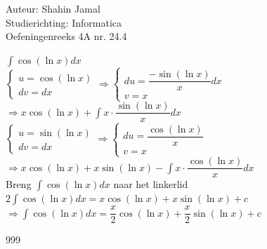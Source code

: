 \documentclass[a4paper]{article}
\begin{document}
  
\noindent \large Auteur: Shahin Jamal \\
\noindent \large Studierichting: Informatica\\
\noindent \large Oefeningenreeks 4A nr. 24.4\\

\medskip

\normalsize

$\displaystyle\int\cos(\ln x) dx$\\

$\left\{
   \begin{array}{l}
       u = \cos(\ln x)\\
       dv = dx
   \end{array}
\right.
\Rightarrow
\left\{
   \begin{array}{l}
       du = \dfrac{-\sin(\ln x)}{x}dx \\
       v = x
   \end{array}
\right.$\\

$\Rightarrow x\cos(\ln x) + \displaystyle\int x \cdot \dfrac{\sin(\ln x)}{x} dx$\\

$\left\{
   \begin{array}{l}
       u = \sin(\ln x)\\
       dv = dx
   \end{array}
\right.
\Rightarrow
\left\{
   \begin{array}{l}
       du = \dfrac{\cos(\ln x)}{x} \\
       v = x
   \end{array}
\right.$\\

$\Rightarrow x \cos(\ln x) + x\sin(\ln x) - \displaystyle\int x\cdot \dfrac{\cos(\ln x)}{x} dx$\\

Breng $\displaystyle\int \cos(\ln x) dx$ naar het linkerlid\\

$2\displaystyle\int \cos(\ln x)dx = x\cos(\ln x) + x\sin(\ln x)+c$\\

$\Rightarrow \displaystyle\int \cos(\ln x)dx = \dfrac{x}{2}\cos(\ln x) + \dfrac{x}{2}\sin(\ln x) + c$\\

\begin{thebibliography}{999}
\end{thebibliography}
\end{document}
